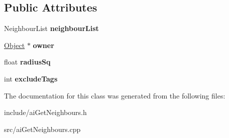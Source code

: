 \subsection*{\-Public \-Attributes}
\begin{DoxyCompactItemize}
\item 
\hypertarget{classAIGetNeighbours_ad3744e20f4c2d96127c5de2cdd6eebf8}{
\-Neighbour\-List {\bfseries neighbour\-List}}
\label{d0/de6/classAIGetNeighbours_ad3744e20f4c2d96127c5de2cdd6eebf8}

\item 
\hypertarget{classAIGetNeighbours_a09901a821454654371180a650d895e80}{
\hyperlink{classObject}{\-Object} $\ast$ {\bfseries owner}}
\label{d0/de6/classAIGetNeighbours_a09901a821454654371180a650d895e80}

\item 
\hypertarget{classAIGetNeighbours_a9f973c05a433526a22eb13f00cc27102}{
float {\bfseries radius\-Sq}}
\label{d0/de6/classAIGetNeighbours_a9f973c05a433526a22eb13f00cc27102}

\item 
\hypertarget{classAIGetNeighbours_adaea1e2061e71a3496c3f4d6e874e998}{
int {\bfseries exclude\-Tags}}
\label{d0/de6/classAIGetNeighbours_adaea1e2061e71a3496c3f4d6e874e998}

\end{DoxyCompactItemize}


\-The documentation for this class was generated from the following files\-:\begin{DoxyCompactItemize}
\item 
include/ai\-Get\-Neighbours.\-h\item 
src/ai\-Get\-Neighbours.\-cpp\end{DoxyCompactItemize}
